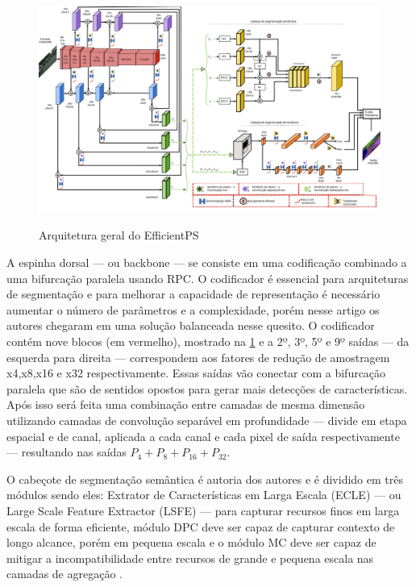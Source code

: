 \begin{figure}[ht]
	\caption{Arquitetura geral do EfficientPS}
	\centering %
	\includegraphics[width=15cm]{figures/arqEP.png} %
	\label{fig:arqEP}
\end{figure}


A espinha dorsal — ou backbone — se consiste em uma codificação combinado a uma bifurcação paralela usando RPC. O codificador é essencial para arquiteturas de segmentação e para melhorar a capacidade de representação é necessário aumentar o número de parâmetros e a complexidade, porém nesse artigo os autores chegaram em uma solução balanceada nesse quesito. O codificador contém nove blocos (em vermelho), mostrado na \cref{fig:arqEP} e a 2º, 3º, 5º e 9º saídas — da esquerda para direita — correspondem aos fatores de redução de amostragem x4,x8,x16 e x32 respectivamente. Essas saídas vão conectar com a bifurcação paralela que são de sentidos opostos para gerar mais detecções de características. Após isso será feita uma combinação entre camadas de mesma dimensão utilizando camadas de convolução separável em profundidade — divide em etapa espacial e de canal, aplicada a cada canal e cada pixel de saída respectivamente — resultando nas saídas $ P_4 + P_8 + P_{16} + P_{32} $\cite{mohan2020efficientps, redes-neurais-convolucionais-separaveis-em-profundidade}.


O cabeçote de segmentação semântica é autoria dos autores e é dividido em três módulos sendo eles: Extrator de Características em Larga Escala (ECLE) — ou Large Scale Feature Extractor (LSFE) — para capturar recursos finos em larga escala de forma eficiente, módulo DPC deve ser capaz de capturar contexto de longo alcance, porém em pequena escala e o módulo MC deve ser capaz de mitigar a incompatibilidade entre recursos de grande e pequena escala nas camadas de agregação \space\cite{mohan2020efficientps}.

